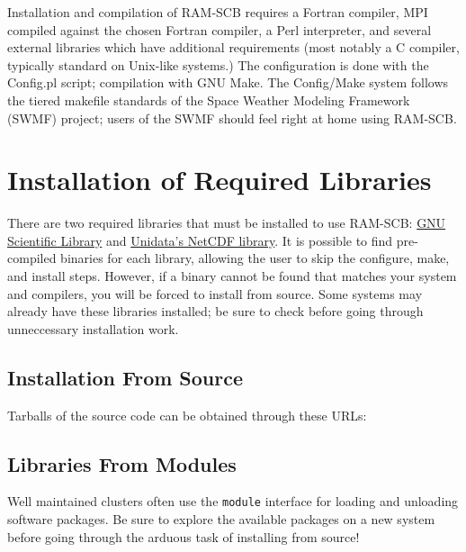 Installation and compilation of RAM-SCB requires a Fortran compiler, MPI compiled against the chosen Fortran compiler, a Perl interpreter, and several external libraries which have additional requirements (most notably a C compiler, typically standard on Unix-like systems.)  The configuration is done with the Config.pl script; compilation with GNU Make.  The Config/Make system follows the tiered makefile standards of the Space Weather Modeling Framework (SWMF) project; users of the SWMF should feel right at home using RAM-SCB.

\section{Installation of Required Libraries}

There are two required libraries that must be installed to use RAM-SCB: \href{https://www.gnu.org/software/gsl}{GNU Scientific Library} and \href{http://www.unidata.ucar.edu/software/netcdf/}{Unidata's NetCDF library}. It is possible to find pre-compiled binaries for each library, allowing the user to skip the configure, make, and install steps. However, if a binary cannot be found that matches your system and compilers, you will be forced to install from source. Some systems may already have these libraries installed; be sure to check before going through unneccessary installation work.

\subsection{Installation From Source}
 
Tarballs of the source code can be obtained through these URLs:

\subsection{Libraries From Modules}
Well maintained clusters often use the {\tt module} interface for loading and unloading software packages.  Be sure to explore the available packages on a new system before going through the arduous task of installing from source!

